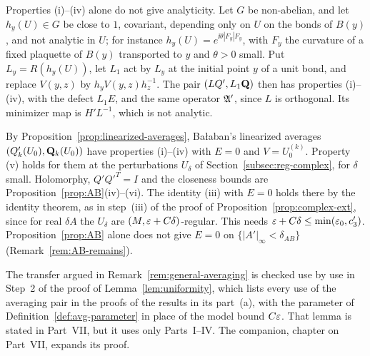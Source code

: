 \begin{remark}
Properties (i)--(iv) alone do not give analyticity. Let $G$ be non-abelian, and let $h_y(U)\in G$ be close to $1$, covariant, depending only on $U$ on the bonds of $B(y)$, and not analytic in $U$; for instance $h_y(U)=e^{\ii\theta|F_y|F_y}$, with $F_y$ the curvature of a fixed plaquette of $B(y)$ transported to $y$ and $\theta>0$ small. Put $L_y=R(h_y(U))$, let $L_1$ act by $L_y$ at the initial point $y$ of a unit bond, and replace $V(y,z)$ by $h_yV(y,z)h_z^{-1}$. The pair $(LQ',L_1\mathbf Q)$ then has properties (i)--(iv), with the defect $L_1E$, and the same operator $\mathfrak A'$, since $L$ is orthogonal. Its minimizer map is $H'L^{-1}$, which is not analytic.

By Proposition~\ref{prop:linearized-averages}, Ba\l aban's linearized averages $(Q'_k(U_0),\mathbf Q_k(U_0))$ have properties (i)--(iv) with $E=0$ and $V=U_0^{(k)}$. Property (v) holds for them at the perturbations $U_\delta$ of Section~\ref{subsec:reg-complex}, for $\delta$ small. Holomorphy, $Q'Q'^T=I$ and the closeness bounds are Proposition~\ref{prop:AB}(iv)--(vi). The identity (iii) with $E=0$ holds there by the identity theorem, as in step~(iii) of the proof of Proposition~\ref{prop:complex-ext}, since for real $\delta\!A$ the $U_\delta$ are $(M,\varepsilon+C\delta)$-regular. This needs $\varepsilon+C\delta\le\min(\varepsilon_0,c'_3)$. Proposition~\ref{prop:AB} alone does not give $E=0$ on $\{|A'|_\infty<\delta_{AB}\}$ (Remark~\ref{rem:AB-remains}).
\end{remark}

The transfer argued in Remark~\ref{rem:general-averaging} is checked use by use in Step~2 of the proof of Lemma~\ref{lem:uniformity}, which lists every use of the averaging pair in the proofs of the results in its part~(a), with the parameter of Definition~\ref{def:avg-parameter} in place of the model bound $C\varepsilon$. That lemma is stated in Part~VII, but it uses only Parts~I--IV. The companion, chapter on Part~VII, expands its proof.
